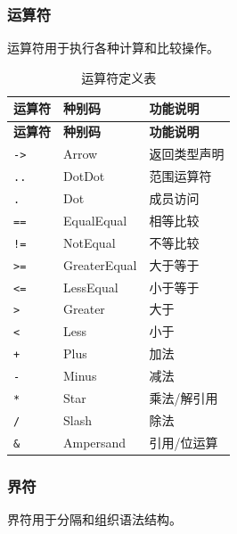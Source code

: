 \documentclass[12pt,a4paper]{ctexart}
\begin{document}
\subsubsection{运算符}

运算符用于执行各种计算和比较操作。

\begin{longtable}{|l|l|l|}
\caption{运算符定义表} \label{tab:operators} \\
\hline
\textbf{运算符} & \textbf{种别码} & \textbf{功能说明} \\
\hline
\endfirsthead
\hline
\textbf{运算符} & \textbf{种别码} & \textbf{功能说明} \\
\hline
\endhead
\hline
\endfoot
\hline
\endlastfoot

\texttt{->} & Arrow & 返回类型声明 \\
\texttt{..} & DotDot & 范围运算符 \\
\texttt{.} & Dot & 成员访问 \\
\texttt{==} & EqualEqual & 相等比较 \\
\texttt{!=} & NotEqual & 不等比较 \\
\texttt{>=} & GreaterEqual & 大于等于 \\
\texttt{<=} & LessEqual & 小于等于 \\
\texttt{>} & Greater & 大于 \\
\texttt{<} & Less & 小于 \\
\texttt{+} & Plus & 加法 \\
\texttt{-} & Minus & 减法 \\
\texttt{*} & Star & 乘法/解引用 \\
\texttt{/} & Slash & 除法 \\
\texttt{\&} & Ampersand & 引用/位运算 \\
\end{longtable}

\subsubsection{界符}

界符用于分隔和组织语法结构。
\end{document}
